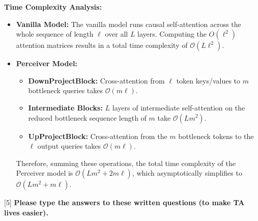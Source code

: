 \begin{parts}
\begin{subparts}
{\textbf{Time Complexity Analysis:}
\begin{itemize}
    \item \textbf{Vanilla Model:} The vanilla model runs causal self-attention across the whole sequence of length $\ell$ over all $L$ layers. Computing the $O(\ell^2)$ attention matrices results in a total time complexity of $\mathcal{O}(L \ell^2)$.
    \item \textbf{Perceiver Model:} 
    \begin{itemize}
        \item \textbf{DownProjectBlock:} Cross-attention from $\ell$ token keys/values to $m$ bottleneck queries takes $\mathcal{O}(m \ell)$.
        \item \textbf{Intermediate Blocks:} $L$ layers of intermediate self-attention on the reduced bottleneck sequence length of $m$ take $\mathcal{O}(L m^2)$.
        \item \textbf{UpProjectBlock:} Cross-attention from the $m$ bottleneck tokens to the $\ell$ output queries takes $\mathcal{O}(m \ell)$.
    \end{itemize}
    Therefore, summing these operations, the total time complexity of the Perceiver model is $\mathcal{O}(L m^2 + 2m \ell)$, which asymptotically simplifies to $\mathcal{O}(L m^2 + m \ell)$.
\end{itemize}
}


\end{subparts}
\end{parts}
[5]
{\color{red} \textbf{Please type the answers to these written questions (to make TA lives easier).}}
